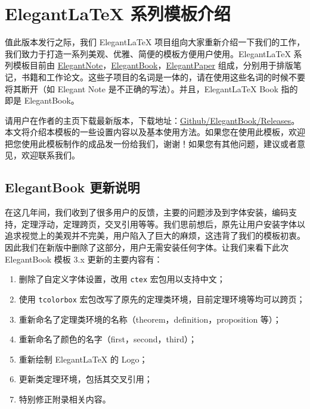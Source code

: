 \documentclass{elegantbook}
\author{ddswhu \& Liam Huang}
\date{\today}
\begin{document}
\maketitle
\tableofcontents
\mainmatter
\chapter{Elegant\LaTeX{} 系列模板介绍}

值此版本发行之际，我们 Elegant\LaTeX{} 项目组向大家重新介绍一下我们的工作，我们致力于打造一系列美观、优雅、简便的模板方便用户使用。Elegant\LaTeX{} 系列模板目前由 \href{https://github.com/ElegantLaTeX/ElegantNote}{ElegantNote}，\href{https://github.com/ElegantLaTeX/ElegantBook}{ElegantBook}，\href{https://github.com/ElegantLaTeX/ElegantPaper}{ElegantPaper} 组成，分别用于排版笔记，书籍和工作论文。这些子项目的名词是一体的，请在使用这些名词的时候不要将其断开（如 Elegant Note 是不正确的写法）。并且，Elegant\LaTeX{}  Book 指的即是 ElegantBook。

请用户在作者的主页下载最新版本，下载地址：\href{https://github.com/ElegantLaTeX/ElegantBook/releases}{Github/ElegantBook/Releases}。本文将介绍本模板的一些设置内容以及基本使用方法。如果您在使用此模板，欢迎把您使用此模板制作的成品发一份给我们，谢谢！如果您有其他问题，建议或者意见，欢迎联系我们。


\section{ElegantBook 更新说明}
在这几年间，我们收到了很多用户的反馈，主要的问题涉及到字体安装，编码支持，定理浮动，定理跨页，交叉引用等等。我们思前想后，原先让用户安装字体以追求视觉上的美观并不完美，用户陷入了巨大的麻烦，这违背了我们的模板初衷。因此我们在新版中删除了这部分，用户无需安装任何字体。让我们来看下此次 ElegantBook 模板 3.x 更新的主要内容有：

\begin{enumerate}[noitemsep]
   \item 删除了自定义字体设置，改用 \texttt{ctex} 宏包用以支持中文；
   \item 使用 \texttt{tcolorbox} 宏包改写了原先的定理类环境，目前定理环境等均可以跨页；
   \item 重新命名了定理类环境的名称（theorem，definition，proposition 等）；
   \item 重新命名了颜色的名字（first，second，third）；
   \item 重新绘制 ElegantLaTeX 的 Logo；
   \item 更新类定理环境，包括其交叉引用；
   \item 特别修正附录相关内容。
\end{enumerate}
\end{document}
